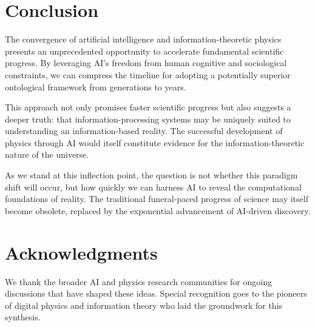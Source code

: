 \documentclass[12pt,preprint]{article}
\begin{document}
\section{Conclusion}

The convergence of artificial intelligence and information-theoretic physics presents an unprecedented opportunity to accelerate fundamental scientific progress. By leveraging AI's freedom from human cognitive and sociological constraints, we can compress the timeline for adopting a potentially superior ontological framework from generations to years.

This approach not only promises faster scientific progress but also suggests a deeper truth: that information-processing systems may be uniquely suited to understanding an information-based reality. The successful development of physics through AI would itself constitute evidence for the information-theoretic nature of the universe.

As we stand at this inflection point, the question is not whether this paradigm shift will occur, but how quickly we can harness AI to reveal the computational foundations of reality. The traditional funeral-paced progress of science may itself become obsolete, replaced by the exponential advancement of AI-driven discovery.

\section*{Acknowledgments}

We thank the broader AI and physics research communities for ongoing discussions that have shaped these ideas. Special recognition goes to the pioneers of digital physics and information theory who laid the groundwork for this synthesis.
\end{document}
